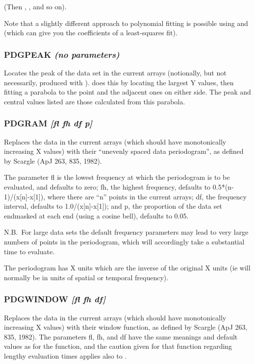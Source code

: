 \documentclass[twoside,11pt,noabs,nolof]{starlink}
\providecommand{\dipcom}[3]{\subsubsection*{\label{COM:#1}\textbf{#1} \emph{#2}}}
\begin{document}
(Then ,  ,  and so on).

Note that a slightly different approach to polynomial fitting is
possible using   and   (which can give you the coefficients
of a least-squares fit).

\dipcom{PDGPEAK}{(no parameters)}{Locates the peak of a data set}
Locates the peak of the data set in the current arrays (notionally, but
not necessarily, produced with ).    does this by locating
the largest Y values, then fitting a parabola to the point and the
adjacent ones on either side. The peak and central values listed are
those calculated from this parabola.

\dipcom{PDGRAM}{[fl fh df p]}{Takes the "unevenly spaced data periodogram" of the current arrays}
Replaces the data in the current arrays (which should have
monotonically increasing X values) with their ``unevenly spaced data
periodogram'', as defined by Scargle (ApJ 263, 835, 1982).

The parameter fl is the lowest frequency at which the periodogram is
to be evaluated, and defaults to zero; fh, the highest frequency,
defaults to 0.5*(n-1)/(x[n]-x[1]), where there are ``n'' points in the
current arrays; df, the frequency interval, defaults to
1.0/(x[n]-x[1]); and p, the proportion of the data set endmasked at
each end (using a cosine bell), defaults to 0.05.

N.B.\ For large data sets the default frequency parameters may lead to
very large numbers of points in the periodogram, which will
accordingly take a substantial time to evaluate.

The periodogram has X units which are the inverse of the original X
units (ie will normally be in units of spatial or temporal frequency).

\dipcom{PDGWINDOW}{[fl fh df]}{Takes the "window function" of the current arrays}
Replaces the data in the current arrays (which should have
monotonically increasing X values) with their window function, as
defined by Scargle (ApJ 263, 835, 1982). The parameters fl, fh, and df
have the same meanings and default values as for the   function,
and the caution given for that function regarding lengthy evaluation
times applies also to .
\end{document}
